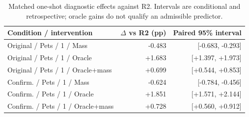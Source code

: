 \begin{table}[t]
\centering\small\setlength{\tabcolsep}{3pt}
\begin{tabular}{lrr}
\toprule
Condition / intervention & $\Delta$ vs R2 (pp) & Paired 95\% interval \\ \midrule
Original / Pets / 1 / Mass & -0.483 & [-0.683, -0.293] \\
Original / Pets / 1 / Oracle & +1.683 & [+1.397, +1.973] \\
Original / Pets / 1 / Oracle+mass & +0.699 & [+0.544, +0.853] \\
Confirm. / Pets / 1 / Mass & -0.624 & [-0.784, -0.456] \\
Confirm. / Pets / 1 / Oracle & +1.851 & [+1.571, +2.144] \\
Confirm. / Pets / 1 / Oracle+mass & +0.728 & [+0.560, +0.912] \\
\bottomrule\end{tabular}
\caption{Matched one-shot diagnostic effects against R2. Intervals are conditional and retrospective; oracle gains do not qualify an admissible predictor.}\label{tab:paired-interventions}
\end{table}
